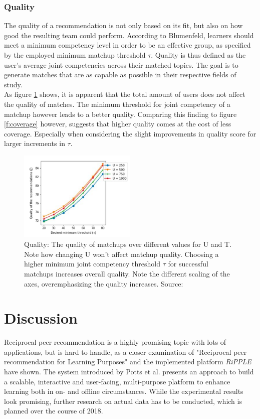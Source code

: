 \documentclass[conference]{IEEEtran}
\begin{document}
\subsubsection{Quality} \label{paper:quality}
The quality of a recommendation is not only based on its fit, but also on how good the resulting team could perform. According to Blumenfeld, learners should meet a minimum competency level in order to be an effective group, as specified by the employed minimum matchup threshold \(\tau\). \cite{blumenfeld1996learning} Quality is thus defined as the user's average joint competencies across their matched topics. The goal is to generate matches that are as capable as possible in their respective fields of study.\\
As figure \ref{f:quality} shows, it is apparent that the total amount of users does not affect the quality of matches. The minimum threshold for joint competency of a matchup however leads to a better quality. Comparing this finding to figure \ref{f:coverage} however, suggests that higher quality comes at the cost of less coverage. Especially when considering the slight improvements in quality score for larger increments in \(\tau\).\\
\begin{figure}[!t]
	\centering
	\includegraphics[width=0.5\textwidth]{g/QualityByU.PNG}
	\caption{Quality: The quality of matchups over different values for U and T. Note how changing U won't affect matchup quality. Choosing a higher minimum joint competency threshold \(\tau\) for successful matchups increases overall quality. Note the different scaling of the axes, overemphasizing the quality increases. Source: \cite{potts2018reciprocal}}
	\label{f:quality}
\end{figure}

\section{Discussion} \label{extensions}\label{paper:discussion}
Reciprocal peer recommendation is a highly promising topic with lots of applications, but is hard to handle, as a closer examination of "Reciprocal peer recommendation for Learning Purposes" and the implemented platform \textit{RiPPLE} have shown. The system introduced by Potts et al. presents an approach to build a scalable, interactive and user-facing, multi-purpose platform to enhance learning both in on- and offline circumstances. While the experimental results look promising, further research on actual data has to be conducted, which is planned over the course of 2018.\\
\end{document}

